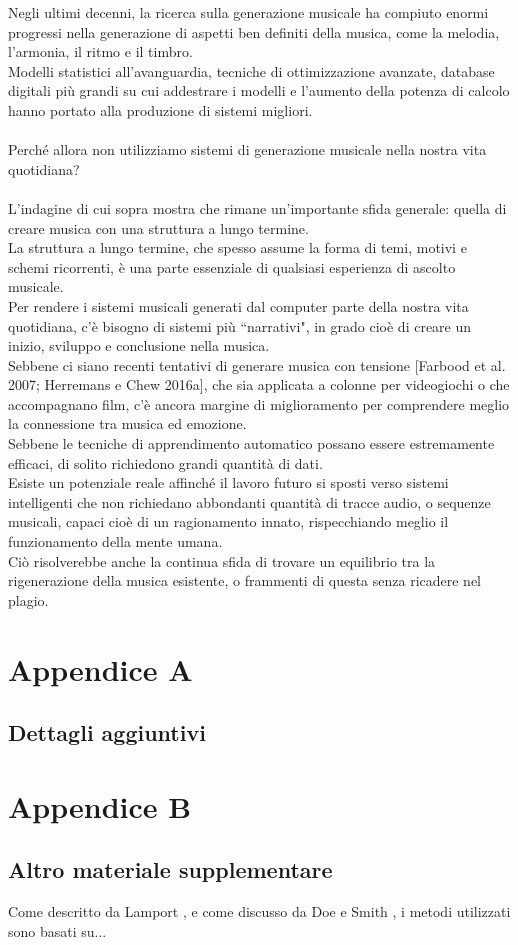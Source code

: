 \documentclass[a4paper,12pt]{report}
\begin{document}
Negli ultimi decenni, la ricerca sulla generazione musicale ha compiuto enormi progressi nella generazione di aspetti ben definiti della musica, come la melodia, l’armonia, il ritmo e il timbro. \\
Modelli statistici all’avanguardia, tecniche di ottimizzazione avanzate, database digitali più grandi su cui addestrare i modelli e l’aumento della potenza di calcolo hanno portato alla produzione di sistemi migliori. \\
\\
Perché allora non utilizziamo sistemi di generazione musicale nella nostra vita quotidiana? \\
\\
L’indagine di cui sopra mostra che rimane un’importante sfida generale: quella di creare musica con una struttura a lungo termine. \\
La struttura a lungo termine, che spesso assume la forma di temi, motivi e schemi ricorrenti, è una parte essenziale di qualsiasi esperienza di ascolto musicale. \\
Per rendere i sistemi musicali generati dal computer parte della nostra vita quotidiana, c’è bisogno di sistemi più “narrativi", in grado cioè di creare un inizio, sviluppo e conclusione nella musica. \\
Sebbene ci siano recenti tentativi di generare musica con tensione [Farbood et al. 2007; Herremans e Chew 2016a], che sia applicata a colonne per videogiochi o che accompagnano film, c’è ancora margine di miglioramento per comprendere meglio la connessione tra musica ed emozione. \\
Sebbene le tecniche di apprendimento automatico possano essere estremamente efficaci, di solito richiedono grandi quantità di dati. \\
Esiste un potenziale reale affinché il lavoro futuro si sposti verso sistemi intelligenti che non richiedano abbondanti quantità di tracce audio, o sequenze musicali, 
capaci cioè di un ragionamento innato, rispecchiando meglio il funzionamento della mente umana. \\
Ciò risolverebbe anche la continua sfida di trovare un equilibrio tra la rigenerazione della musica esistente, o frammenti di questa senza ricadere nel plagio.

\appendix
\chapter{Appendice A}
\section{Dettagli aggiuntivi}

\chapter{Appendice B}
\section{Altro materiale supplementare}

Come descritto da Lamport \cite{latex}, e come discusso da Doe e Smith \cite{example_article}, i metodi utilizzati sono basati su...



\end{document}
